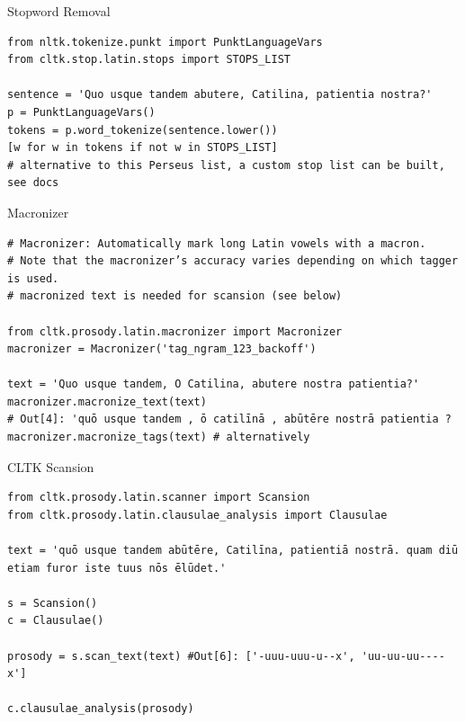 \documentclass[10pt]{beamer}
\begin{document}
\begin{frame}{Stopword Removal} 
\begin{verbatim}
from nltk.tokenize.punkt import PunktLanguageVars
from cltk.stop.latin.stops import STOPS_LIST

sentence = 'Quo usque tandem abutere, Catilina, patientia nostra?'
p = PunktLanguageVars()
tokens = p.word_tokenize(sentence.lower())
[w for w in tokens if not w in STOPS_LIST]
# alternative to this Perseus list, a custom stop list can be built, see docs
\end{verbatim}
\end{frame}

\begin{frame}{Macronizer} 
\begin{verbatim}
# Macronizer: Automatically mark long Latin vowels with a macron. 
# Note that the macronizer’s accuracy varies depending on which tagger is used.
# macronized text is needed for scansion (see below)

from cltk.prosody.latin.macronizer import Macronizer
macronizer = Macronizer('tag_ngram_123_backoff')

text = 'Quo usque tandem, O Catilina, abutere nostra patientia?'
macronizer.macronize_text(text)
# Out[4]: 'quō usque tandem , ō catilīnā , abūtēre nostrā patientia ?
macronizer.macronize_tags(text) # alternatively
\end{verbatim}
\end{frame}

\begin{frame}{CLTK Scansion} 
\begin{verbatim}
from cltk.prosody.latin.scanner import Scansion
from cltk.prosody.latin.clausulae_analysis import Clausulae

text = 'quō usque tandem abūtēre, Catilīna, patientiā nostrā. quam diū etiam furor iste tuus nōs ēlūdet.'

s = Scansion()
c = Clausulae()

prosody = s.scan_text(text) #Out[6]: ['-uuu-uuu-u--x', 'uu-uu-uu----x']

c.clausulae_analysis(prosody)
\end{verbatim}
\end{frame}
\end{document}

